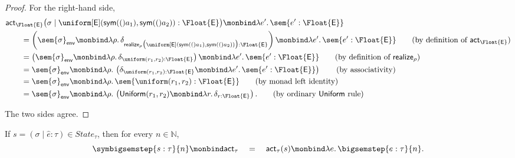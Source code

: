 \begin{proof}
For the right-hand side,
\begin{align}
  &\mathsf{act}_{\Float{\E}}
  \bigl(
    \sigma
    \mid
    \uniform[\E](\sym(a_1),\sym(a_2)):\Float{\E}
  \bigr)
  \monbind
  \lambda e'.\,\sem{e':\Float{\E}}
  \notag
  \\
  &\qquad=
  \left(
    \sem{\sigma}_{\mathsf{env}}
    \monbind
    \lambda\rho.\,
    \delta_{
      \mathsf{realize}_\rho
      \bigl(
        \uniform[\E](\sym(a_1),\sym(a_2))
      \bigr)
      :\Float{\E}
    }
  \right)
  \monbind
  \lambda e'.\,\sem{e':\Float{\E}}
  \tag{\text{by definition of $\mathsf{act}_{\Float{\E}}$}}
  \\
  &\qquad=
  \left(
    \sem{\sigma}_{\mathsf{env}}
    \monbind
    \lambda\rho.\,
    \delta_{
      \uniform(r_1,r_2):\Float{\E}
    }
  \right)
  \monbind
  \lambda e'.\,\sem{e':\Float{\E}}
  \tag{\text{by definition of $\mathsf{realize}_\rho$}}
  \\
  &\qquad=
  \sem{\sigma}_{\mathsf{env}}
  \monbind
  \lambda\rho.\,
  \left(
    \delta_{\uniform(r_1,r_2):\Float{\E}}
    \monbind
    \lambda e'.\,\sem{e':\Float{\E}}
  \right)
  \tag{\text{by associativity}}
  \\
  &\qquad=
  \sem{\sigma}_{\mathsf{env}}
  \monbind
  \lambda\rho.\,
  \sem{\uniform(r_1,r_2):\Float{\E}}
  \tag{\text{by monad left identity}}
  \\
  &\qquad=
  \sem{\sigma}_{\mathsf{env}}
  \monbind
  \lambda\rho.\,
  \left(
    \mathsf{Uniform}(r_1,r_2)
    \monbind
    \lambda r.\,
    \delta_{r:\Float{\E}}
  \right).
  \tag{\text{by ordinary $\mathsf{Uniform}$ rule}}
\end{align}

The two sides agree.

\end{proof}



\begin{theorem}
  \label{thm:actual-n-step}
  If $s = (\sigma \mid \hat e : \tau) \in State_\tau$, then for
  every $n \in \mathbb{N}$,
  \[
    \symbigsemstep{s : \tau}{n}
    \monbind
    \mathsf{act}_\tau
    \quad 
    = 
    \quad
    \mathsf{act}_\tau(s)
    \monbind
    \lambda e.\,\bigsemstep{e : \tau}{n}.
  \]
\end{theorem}


